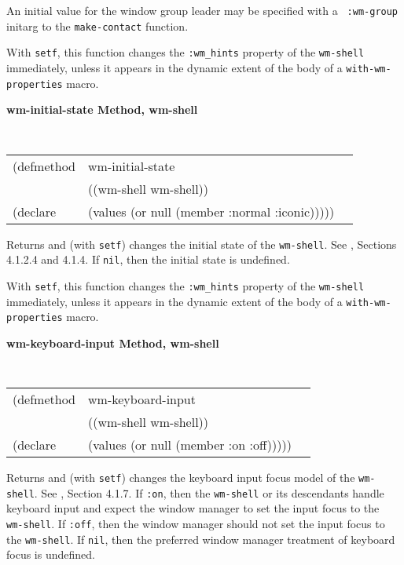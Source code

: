 \documentclass[twoside]{book}
\begin{document}
\begin{sloppy}
\begin{flushright}
{An initial value for the window group leader may be specified with a {\tt
:wm-group} initarg to the {\tt make-contact} function.

With {\tt setf}, this function changes the {\tt :wm\_hints} property of
the {\tt wm-shell} immediately, unless it appears in the dynamic extent of the
body of a {\tt with-wm-properties} macro.


}\end{flushright}


{\samepage
{\large {\bf wm-initial-state \hfill Method, wm-shell}}
\begin{flushright} \parbox[t]{6.125in}{
\tt
\begin{tabular}{lll}
\raggedright
(defmethod & wm-initial-state & \\
           & ((wm-shell  wm-shell)) \\
(declare   & (values (or null (member :normal :iconic)))))
\end{tabular}
\rm

}\end{flushright}}

\begin{flushright} \parbox[t]{6.125in}{
Returns and (with {\tt setf}) changes the initial state of the {\tt wm-shell}. 
See \cite{icccm}, Sections 4.1.2.4 and 4.1.4. If {\tt nil}, then the initial state is
undefined. 

With {\tt setf}, this function changes the {\tt :wm\_hints} property of
the {\tt wm-shell} immediately, unless it appears in the dynamic extent of the
body of a {\tt with-wm-properties} macro.
}\end{flushright}


{\samepage
{\large {\bf wm-keyboard-input \hfill Method, wm-shell}}
\begin{flushright} \parbox[t]{6.125in}{
\tt
\begin{tabular}{lll}
\raggedright
(defmethod & wm-keyboard-input & \\
           & ((wm-shell  wm-shell)) \\
(declare   & (values (or null (member :on :off)))))
\end{tabular}
\rm

}\end{flushright}}

\begin{flushright} \parbox[t]{6.125in}{ Returns and (with {\tt setf}) changes
the keyboard input focus model of the {\tt wm-shell}. See \cite{icccm}, Section
4.1.7. If {\tt :on}, then the {\tt wm-shell} or its descendants handle keyboard
input and expect the window manager to set the input focus to the {\tt
wm-shell}. If {\tt :off}, then the window manager should not set the input
focus to the {\tt wm-shell}. If {\tt nil}, then the preferred window manager
treatment of keyboard focus is undefined. 

}
\end{flushright}
\end{sloppy}
\end{document}
